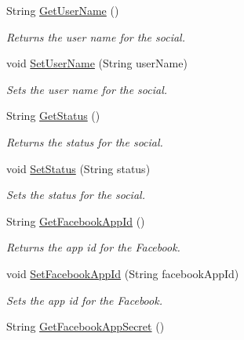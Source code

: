 \begin{DoxyCompactItemize}
\item 
String \hyperlink{classcom_1_1shephertz_1_1app42_1_1paas_1_1sdk_1_1csharp_1_1social_1_1_social_a1de621a474409b68144c4810fae0da3a}{Get\+User\+Name} ()
\begin{DoxyCompactList}\small\item\em Returns the user name for the social. \end{DoxyCompactList}\item 
void \hyperlink{classcom_1_1shephertz_1_1app42_1_1paas_1_1sdk_1_1csharp_1_1social_1_1_social_a67d09a06a5434261cb70190670768f45}{Set\+User\+Name} (String user\+Name)
\begin{DoxyCompactList}\small\item\em Sets the user name for the social. \end{DoxyCompactList}\item 
String \hyperlink{classcom_1_1shephertz_1_1app42_1_1paas_1_1sdk_1_1csharp_1_1social_1_1_social_ac740efcb0c8f8d33499bdc18d29157a7}{Get\+Status} ()
\begin{DoxyCompactList}\small\item\em Returns the status for the social. \end{DoxyCompactList}\item 
void \hyperlink{classcom_1_1shephertz_1_1app42_1_1paas_1_1sdk_1_1csharp_1_1social_1_1_social_a999ad41045293ce2e749fec2582bef0a}{Set\+Status} (String status)
\begin{DoxyCompactList}\small\item\em Sets the status for the social. \end{DoxyCompactList}\item 
String \hyperlink{classcom_1_1shephertz_1_1app42_1_1paas_1_1sdk_1_1csharp_1_1social_1_1_social_abb2934c7bfc406f701184e7af52a935c}{Get\+Facebook\+App\+Id} ()
\begin{DoxyCompactList}\small\item\em Returns the app id for the Facebook. \end{DoxyCompactList}\item 
void \hyperlink{classcom_1_1shephertz_1_1app42_1_1paas_1_1sdk_1_1csharp_1_1social_1_1_social_aa9cc72ac97d458683124c84279e7864a}{Set\+Facebook\+App\+Id} (String facebook\+App\+Id)
\begin{DoxyCompactList}\small\item\em Sets the app id for the Facebook. \end{DoxyCompactList}\item 
String \hyperlink{classcom_1_1shephertz_1_1app42_1_1paas_1_1sdk_1_1csharp_1_1social_1_1_social_a30cf2bb70db5258811f04db2956f2caf}{Get\+Facebook\+App\+Secret} ()

\end{DoxyCompactItemize}
